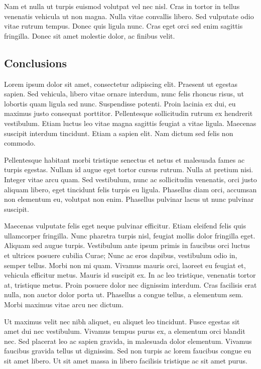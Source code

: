 \documentclass[runningheads,a4paper]{llncs}
\begin{document}
Nam et nulla ut turpis euismod volutpat vel nec nisl. Cras in tortor in tellus venenatis vehicula ut non magna. Nulla vitae convallis libero. Sed vulputate odio vitae rutrum tempus. Donec quis ligula nunc. Cras eget orci sed enim sagittis fringilla. Donec sit amet molestie dolor, ac finibus velit.
%
\newpage
%
\subsection{Conclusions}
Lorem ipsum dolor sit amet, consectetur adipiscing elit. Praesent ut egestas sapien. Sed vehicula, libero vitae ornare interdum, nunc felis rhoncus risus, ut lobortis quam ligula sed nunc. Suspendisse potenti. Proin lacinia ex dui, eu maximus justo consequat porttitor. Pellentesque sollicitudin rutrum ex hendrerit vestibulum. Etiam luctus leo vitae magna sagittis feugiat a vitae ligula. Maecenas suscipit interdum tincidunt. Etiam a sapien elit. Nam dictum sed felis non commodo.

Pellentesque habitant morbi tristique senectus et netus et malesuada fames ac turpis egestas. Nullam id augue eget tortor cursus rutrum. Nulla at pretium nisi. Integer vitae arcu quam. Sed vestibulum, nunc ac sollicitudin venenatis, orci justo aliquam libero, eget tincidunt felis turpis eu ligula. Phasellus diam orci, accumsan non elementum eu, volutpat non enim. Phasellus pulvinar lacus ut nunc pulvinar suscipit.

Maecenas vulputate felis eget neque pulvinar efficitur. Etiam eleifend felis quis ullamcorper fringilla. Nunc pharetra turpis nisl, feugiat mollis dolor fringilla eget. Aliquam sed augue turpis. Vestibulum ante ipsum primis in faucibus orci luctus et ultrices posuere cubilia Curae; Nunc ac eros dapibus, vestibulum odio in, semper tellus. Morbi non mi quam. Vivamus mauris orci, laoreet eu feugiat et, vehicula efficitur metus. Mauris id suscipit ex. In ac leo tristique, venenatis tortor at, tristique metus. Proin posuere dolor nec dignissim interdum. Cras facilisis erat nulla, non auctor dolor porta ut. Phasellus a congue tellus, a elementum sem. Morbi maximus vitae arcu nec dictum.

Ut maximus velit nec nibh aliquet, eu aliquet leo tincidunt. Fusce egestas sit amet dui nec vestibulum. Vivamus tempus purus ex, a elementum orci blandit nec. Sed placerat leo ac sapien gravida, in malesuada dolor elementum. Vivamus faucibus gravida tellus ut dignissim. Sed non turpis ac lorem faucibus congue eu sit amet libero. Ut sit amet massa in libero facilisis tristique ac sit amet purus.
\end{document}
